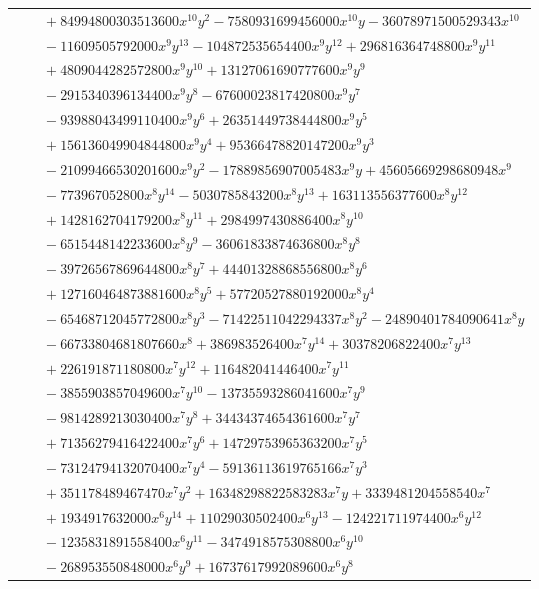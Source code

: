 \documentclass[11pt]{article}
\begin{document}
\begin{longtable}{@{}ll@{}}
 & $\quad +84994800303513600x^{10}y^{2}-7580931699456000x^{10}y-36078971500529343x^{10}$\\
 & $\quad -11609505792000x^{9}y^{13}-104872535654400x^{9}y^{12}+296816364748800x^{9}y^{11}$\\
 & $\quad +4809044282572800x^{9}y^{10}+13127061690777600x^{9}y^{9}$\\
 & $\quad -2915340396134400x^{9}y^{8}-67600023817420800x^{9}y^{7}$\\
 & $\quad -93988043499110400x^{9}y^{6}+26351449738444800x^{9}y^{5}$\\
 & $\quad +156136049904844800x^{9}y^{4}+95366478820147200x^{9}y^{3}$\\
 & $\quad -21099466530201600x^{9}y^{2}-17889856907005483x^{9}y+45605669298680948x^{9}$\\
 & $\quad -773967052800x^{8}y^{14}-5030785843200x^{8}y^{13}+163113556377600x^{8}y^{12}$\\
 & $\quad +1428162704179200x^{8}y^{11}+2984997430886400x^{8}y^{10}$\\
 & $\quad -6515448142233600x^{8}y^{9}-36061833874636800x^{8}y^{8}$\\
 & $\quad -39726567869644800x^{8}y^{7}+44401328868556800x^{8}y^{6}$\\
 & $\quad +127160464873881600x^{8}y^{5}+57720527880192000x^{8}y^{4}$\\
 & $\quad -65468712045772800x^{8}y^{3}-71422511042294337x^{8}y^{2}-24890401784090641x^{8}y$\\
 & $\quad -66733804681807660x^{8}+386983526400x^{7}y^{14}+30378206822400x^{7}y^{13}$\\
 & $\quad +226191871180800x^{7}y^{12}+116482041446400x^{7}y^{11}$\\
 & $\quad -3855903857049600x^{7}y^{10}-13735593286041600x^{7}y^{9}$\\
 & $\quad -9814289213030400x^{7}y^{8}+34434374654361600x^{7}y^{7}$\\
 & $\quad +71356279416422400x^{7}y^{6}+14729753965363200x^{7}y^{5}$\\
 & $\quad -73124794132070400x^{7}y^{4}-59136113619765166x^{7}y^{3}$\\
 & $\quad +351178489467470x^{7}y^{2}+16348298822583283x^{7}y+3339481204558540x^{7}$\\
 & $\quad +1934917632000x^{6}y^{14}+11029030502400x^{6}y^{13}-124221711974400x^{6}y^{12}$\\
 & $\quad -1235831891558400x^{6}y^{11}-3474918575308800x^{6}y^{10}$\\
 & $\quad -268953550848000x^{6}y^{9}+16737617992089600x^{6}y^{8}$\\

\end{longtable}
\end{document}

